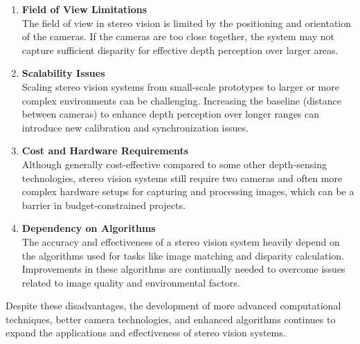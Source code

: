\documentclass[22pt]{report}
\begin{document}
\begin{enumerate}
            \item \textbf{Field of View Limitations}\\
                The field of view in stereo vision is limited by the positioning and orientation of the cameras. If the cameras are too close together, the system may not capture sufficient disparity for effective depth perception over larger areas.
            \item \textbf{Scalability Issues}\\
                Scaling stereo vision systems from small-scale prototypes to larger or more complex environments can be challenging. Increasing the baseline (distance between cameras) to enhance depth perception over longer ranges can introduce new calibration and synchronization issues.
            \item \textbf{Cost and Hardware Requirements}\\
                Although generally cost-effective compared to some other depth-sensing technologies, stereo vision systems still require two cameras and often more complex hardware setups for capturing and processing images, which can be a barrier in budget-constrained projects.
            \item \textbf{Dependency on Algorithms}\\
                The accuracy and effectiveness of a stereo vision system heavily depend on the algorithms used for tasks like image matching and disparity calculation. Improvements in these algorithms are continually needed to overcome issues related to image quality and environmental factors.
        \end{enumerate}
        Despite these disadvantages, the development of more advanced computational techniques, better camera technologies, and enhanced algorithms continues to expand the applications and effectiveness of stereo vision systems.
\end{document}

